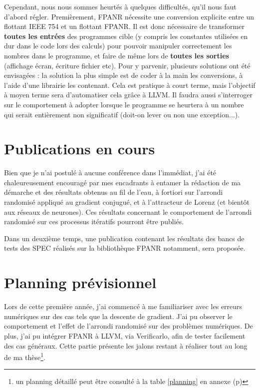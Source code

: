 \documentclass[a4paper,11pt]{article}
\begin{document}
Cependant, nous nous sommes heurtés à quelques difficultés, qu'il nous faut d'abord régler.
Premièrement, FPANR nécessite une conversion explicite entre un flottant IEEE 754 et un flottant FPANR. Il est donc nécessaire de transformer \textbf{toutes les entrées} des programmes cible (y compris les constantes utilisées en dur dans le code lors des calculs) pour pouvoir manipuler correctement les nombres dans le programme, et faire de même lors de \textbf{toutes les sorties} (affichage écran, écriture fichier etc). 
Pour y parvenir, plusieurs solutions ont été envisagées : la solution la plus simple est de coder à la main les conversions, à l’aide d’une librairie les contenant. Cela est pratique à court terme, mais l’objectif à moyen terme sera d’automatiser cela grâce à LLVM.
Il faudra aussi s’interroger sur le comportement à adopter lorsque le programme se heurtera à un nombre qui serait entièrement non significatif (doit-on lever ou non une exception...).


\section{Publications en cours}
Bien que je n'ai postulé à aucune conférence dans l'immédiat, j'ai été chaleureusement encouragé par mes encadrants à entamer la rédaction de ma démarche et des résultats obtenus au fil de l'eau, à fortiori sur l'arrondi randomisé appliqué au gradient conjugué, et à l'attracteur de Lorenz (et bientôt aux réseaux de neurones). Ces résultats concernant le comportement de l'arrondi randomisé sur ces processus itératifs pourront être publiés.

Dans un deuxième temps, une publication contenant les résultats des bancs de tests des SPEC\cite{specweb} réalisés sur la bibliothèque FPANR  notamment, sera proposée.

\section{Planning prévisionnel}
Lors de cette première année, j'ai commencé à me familiariser avec les erreurs numériques sur des cas tels que la descente de gradient.
J'ai pu observer le comportement et l’effet de l’arrondi randomisé sur des problèmes numériques. 
De plus, j'ai pu intégrer FPANR à LLVM, via Verificarlo, afin de tester facilement des cas généraux.
Cette partie présente les jalons restant à réaliser tout au long de ma thèse\footnote{un planning détaillé peut être consulté à la table \ref{planning} en annexe (p\pageref{planning})}.
\end{document}
